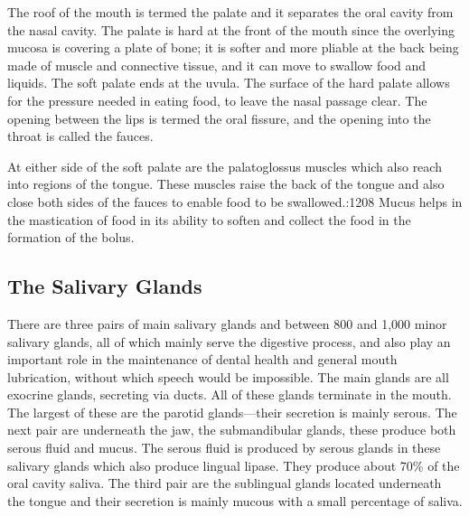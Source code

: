 The roof of the mouth is termed the palate and it separates the oral cavity from the nasal cavity. The palate is hard at the front of the mouth since the overlying mucosa is covering a plate of bone; it is softer and more pliable at the back being made of muscle and connective tissue, and it can move to swallow food and liquids. The soft palate ends at the uvula. The surface of the hard palate allows for the pressure needed in eating food, to leave the nasal passage clear. The opening between the lips is termed the oral fissure, and the opening into the throat is called the fauces.

At either side of the soft palate are the palatoglossus muscles which also reach into regions of the tongue. These muscles raise the back of the tongue and also close both sides of the fauces to enable food to be swallowed.:1208 Mucus helps in the mastication of food in its ability to soften and collect the food in the formation of the bolus.

\hypertarget{the-salivary-glands}{%
\subsection{The Salivary Glands}\label{the-salivary-glands}}

There are three pairs of main salivary glands and between 800 and 1,000 minor salivary glands, all of which mainly serve the digestive process, and also play an important role in the maintenance of dental health and general mouth lubrication, without which speech would be impossible. The main glands are all exocrine glands, secreting via ducts. All of these glands terminate in the mouth. The largest of these are the parotid glands---their secretion is mainly serous. The next pair are underneath the jaw, the submandibular glands, these produce both serous fluid and mucus. The serous fluid is produced by serous glands in these salivary glands which also produce lingual lipase. They produce about 70\% of the oral cavity saliva. The third pair are the sublingual glands located underneath the tongue and their secretion is mainly mucous with a small percentage of saliva.



